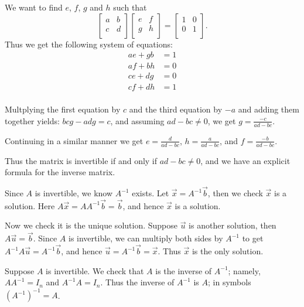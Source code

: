 \documentclass[12pt,letterpaper]{article}
\begin{document}
\newpage
{}%
\lhead{}
\rhead{}
\thispagestyle{fancy}

\begin{enumerate}
\Answer We want to find $e$, $f$, $g$ and $h$ such that 
$$\begin{bmatrix}
a & b\\
c & d\\
\end{bmatrix}\begin{bmatrix}
e & f\\
g &h\\
\end{bmatrix}=\begin{bmatrix}
1 & 0\\
0 & 1\\
\end{bmatrix}.$$
Thus we get the following system of equations:
\begin{align*}
	ae+gb&=1\\
	af+bh&=0\\
	ce+dg&=0\\
	cf+dh&=1\\
\end{align*}

Multplying the first equation by $c$ and the third equation by $-a$ and adding them together yields: $bcg-adg=c$, and assuming $ad-bc\neq0$, we get $g=\frac{-c}{ad-bc}$.

Continuing in a similar manner we get $e=\frac{d}{ad-bc}$, $h=\frac{a}{ad-bc}$, and $f=\frac{-b}{ad-bc}$.

Thus the matrix is invertible if and only if $ad-bc\neq0$, and we have an explicit formula for the inverse matrix.

\Answer Since $A$ is invertible, we know $A^{-1}$ exists. Let $\vec{x}=A^{-1}\vec{b}$, then we check $\vec{x}$ is a solution. Here $A\vec{x}=AA^{-1}\vec{b}=\vec{b}$, and hence $\vec{x}$ is a solution.

Now we check it is the unique solution. Suppose $\vec{u}$ is another solution, then $A\vec{u}=\vec{b}$. Since $A$ is invertible, we can multiply both sides by $A^{-1}$ to get $A^{-1}A\vec{u}=A^{-1}\vec{b}$, and hence $\vec{u}=A^{-1}\vec{b}=\vec{x}$. Thus $\vec{x}$ is the only solution.

\Answer 

\begin{enumerate}
	
	\Part Suppose $A$ is invertible. We check that $A$ is the inverse of $A^{-1}$; namely, $AA^{-1}=I_n$ and $A^{-1}A=I_n$. Thus the inverse of $A^{-1}$ is $A$; in symbols $(A^{-1})^{-1}=A$.
	

\end{enumerate}
\end{enumerate}
\end{document}
